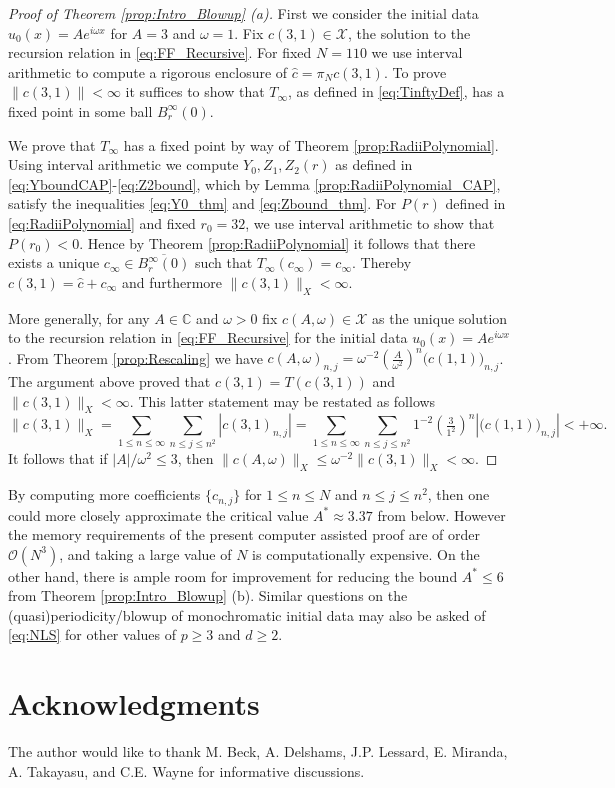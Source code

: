\documentclass{article}
\newcommand{\C}{\mathbb{C}}
\newcommand{\cTrunc}{\hat{c}}
\newcommand{\cO}{\mathcal{O}}
\newcommand{\cX}{\mathcal{X}}
\begin{document}
\begin{proof}[Proof of Theorem \ref{prop:Intro_Blowup} (a)]	
	First we consider the initial data $u_0(x) =   A e^{ i \omega  x}$  for $ A=3$ and $ \omega =1 $. 
	Fix $  c(3,1) \in \cX$, the solution to the recursion relation in \eqref{eq:FF_Recursive}. 
	For fixed $N = 110 $ we  use interval arithmetic to  compute a rigorous enclosure of  $\cTrunc = \pi_N c(3,1)$. 
	To prove $\|c(3,1)\| < \infty$ it suffices to show that $ T_\infty$, as defined in \eqref{eq:TinftyDef}, has a fixed point in some ball $ B_r^\infty(0)$. 
	
	We prove that $ T_\infty$ has a fixed point by way of Theorem  \ref{prop:RadiiPolynomial}. 
	Using interval arithmetic we compute $Y_0, Z_1, Z_2(r)$ as defined in \eqref{eq:YboundCAP}-\eqref{eq:Z2bound},  
	which by Lemma \ref{prop:RadiiPolynomial_CAP}, 
	satisfy the inequalities \eqref{eq:Y0_thm} and \eqref{eq:Zbound_thm}. 	
	For $P(r)$ defined in \eqref{eq:RadiiPolynomial} and fixed $r_0 = 32$, we use interval arithmetic to show that $P(r_0) <  0$. 
	Hence by 	Theorem  \ref{prop:RadiiPolynomial} it follows that there exists a unique $ c_\infty \in \overline{B_r^\infty( 0)}$ such  that $ T_\infty(c_\infty) = c_\infty$. 
	Thereby  $ c(3,1) =  \hat{c} + c_\infty $  and furthermore $ \| c(3,1) \|_X < \infty$. 

	 
	 More generally, for any $ A \in \C$ and $\omega>0$ fix $ c(A,\omega) \in \cX$ as the unique solution to the recursion relation in \eqref{eq:FF_Recursive} for the initial data $ u_0(x) = A e^{i \omega x}$. 
	From Theorem \ref{prop:Rescaling} we have 
	$
	c(A,\omega )_{n,j} = \omega^{-2} \left(
	\frac{A}{\omega^2}
	\right)^n
	\big( c(1,1) \big)_{n,j}
	$. 
	The argument above proved that $c(3,1) = T( c(3,1) )$ and  $ \| c(3,1) \|_X < \infty$. 
	This latter statement  may be restated as follows
	\[
	\| c(3,1) \|_{X} 
	=
	\sum_{1\leq n \leq \infty} \sum_{n \leq j \leq n^2} |c(3,1)_{n,j}|
		=
	\sum_{1\leq n \leq \infty} \sum_{n \leq j \leq n^2} 
	1^{-2} \left(
	\tfrac{3}{1^2}
	\right)^n
	\left|	\big( c(1,1) \big)_{n,j} \right|
	< + \infty .
	\]
	It follows that if $ |A|/\omega^2 \leq 3$, then $\| c(A,\omega) \|_{X} \leq \omega^{-2} \| c(3,1) \|_{X} < \infty$. 
	
	 
	 
	
\end{proof}




By computing more coefficients $\{c_{n,j}\}$ for $1 \leq n \leq N$ and $n \leq j \leq n^2$, then one could more closely approximate the critical value $A^* \approx 3.37$ from below.  
However the memory requirements of the present computer assisted proof are of order $ \cO(N^3)$, and taking a large value of $N$ is computationally expensive. 
On the other hand,  there is ample room for improvement for reducing the bound $ A^* \leq 6$ from Theorem \ref{prop:Intro_Blowup} (b).   
Similar questions on the (quasi)periodicity/blowup of monochromatic initial data may also be asked of \eqref{eq:NLS} for other values of $ p \geq 3$ and $ d \geq 2$.  

 
 

\section*{Acknowledgments} 
The author would like to thank  M. Beck, A. Delshams,  J.P. Lessard, E. Miranda, A. Takayasu,   and C.E. Wayne for informative discussions.  





\end{document}
